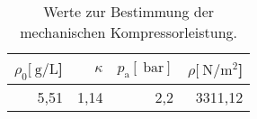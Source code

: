 
\begin{table}[!h]
\begin{center}
\begin{tabular}{|r|r|r|r|}
\hline
$\rho_\mathrm{0}[\SI{}{\gram\per\liter}$] & $\kappa$ & $p_\mathrm{a}[\SI{}{\bar}]$ & $\rho[\SI{}{\newton\per\meter^2}$]\\
\hline
\hline
5,51 & 1,14 & 2,2 & 3311,12\\
\hline
\end{tabular}
\caption[]{Werte zur Bestimmung der mechanischen Kompressorleistung.}
\label{arbeit1}
\end{center}
\end{table}